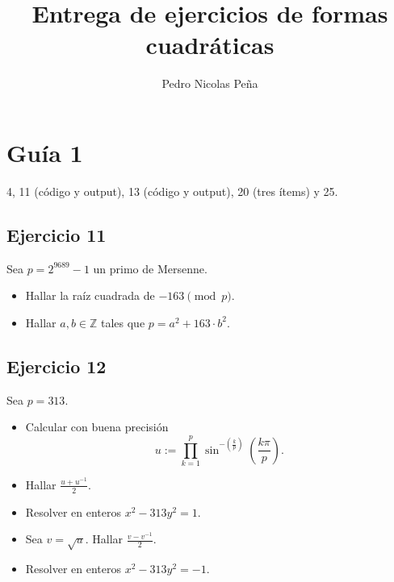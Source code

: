 \documentclass[12pt]{amsart}
\title{Entrega de ejercicios de formas cuadráticas}
\author{Pedro Nicolas Peña}
\newcommand{\ZZ}{\mathbb{Z}}
\newcommand{\lp}{\left(}
\newcommand{\rp}{\right)}
\theoremstyle{plain}
\begin{document}

\maketitle

\section*{Guía 1}

4, 11 (código y output), 13 (código y output), 20 (tres ítems)
y 25.




\subsection*{Ejercicio 11}
Sea $p = 2^{9689} - 1$ un primo de Mersenne.

\begin{multicols}{2}
\begin{itemize}
    \item Hallar la raíz cuadrada de $-163 \pmod{p}$.
    \item Hallar $a, b \in \ZZ$ tales que $p = a^2 + 163 \cdot 
    b^2$.
\end{itemize}
\end{multicols}

\subsection*{Ejercicio 12}
Sea $p = 313$.

\begin{multicols}{2}
\begin{itemize}
    \item Calcular con buena precisión
    $$u := \prod_{k=1}^{p} \sin^{-\lp \frac{k}{p}\rp} \lp 
    \frac{k\pi}{p} \rp.$$
    \item Hallar $\frac{u + u^{-1}}{2}$.
    \item Resolver en enteros $x^2 - 313y^2 = 1$.
    \item Sea $v = \sqrt{u}.$ Hallar $\frac{v - v^{-1}}{2}$.
    \item Resolver en enteros $x^2 - 313y^2 = -1$.
\end{itemize}
\end{multicols}
\end{document}
